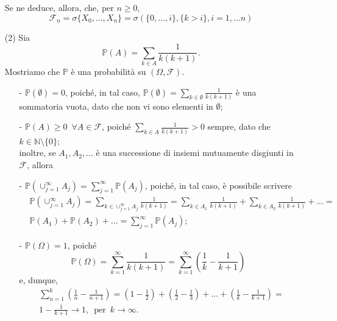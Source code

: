\documentclass[11pt,largemargins]{homework}
\begin{document}
\begin{enumerate}
  Se ne deduce, allora, che, per $n\geq 0$,
  \begin{equation*}
  \mathcal{F}_{n}=\sigma\{X_{0},...,X_{n}\}=\sigma(\{0, \dots , i\}, \{k > i\}, i = 1, \dots n)
  \end{equation*}
  \item[(2)]
  Sia
  \begin{equation*}
  \mathbb{P}\left(A\right)=\sum_{k\in A}\frac{1}{k\left(k+1\right)}.
  \end{equation*}
  Mostriamo che $\mathbb{P}$ è una probabilità su $\left(\Omega,\mathcal{F}\right)$.
  \begin{itemize}
  \item[-]
  $\mathbb{P}\left(\emptyset\right)=0$, poiché, in tal caso, $\mathbb{P}\left(\emptyset\right)=\sum_{k\in \emptyset}\frac{1}{k\left(k+1\right)}$ è una sommatoria vuota, dato che non vi sono elementi in $\emptyset$;
  \item[-]
  $\mathbb{P}\left(A\right)\geq 0 \,\,\,\forall A\in \mathcal{F}$, poiché $\sum_{k\in A}\frac{1}{k\left(k+1\right)}> 0$ sempre, dato che $k \in \mathbb{N}\setminus\{0\}$;\\
  inoltre, se $A_{1},A_{2},...$ è una successione di insiemi mutuamente disgiunti in $\mathcal{F}$, allora 
  \item[-]
  $\mathbb{P}\left(\cup_{j=1}^{\infty}A_{j}\right)=\sum_{j=1}^{\infty}\mathbb{P}\left(A_{j}\right)$, poiché, in tal caso, è possibile scrivere
  \begin{align*}
  &\mathbb{P}\left(\cup_{j=1}^{\infty}A_{j}\right)=\sum_{k\in\cup_{j=1}^{\infty}A_{j}}\frac{1}{k\left(k+1\right)}=\sum_{k\in A_{1}}\frac{1}{k\left(k+1\right)}+\sum_{k\in A_{2}}\frac{1}{k\left(k+1\right)}+...=\\
  &\mathbb{P}\left(A_{1}\right)+\mathbb{P}\left(A_{2}\right)+...=\sum_{j=1}^{\infty}\mathbb{P}\left(A_{j}\right);
\end{align*}   
\item[-]
$\mathbb{P}\left(\Omega\right)=1$, poiché
\begin{equation*}
\mathbb{P}\left(\Omega\right)=\sum_{k=1}^{\infty}\frac{1}{k\left(k+1\right)}=\sum_{k=1}^{\infty}\left(\frac{1}{k}-\frac{1}{k+1}\right)
\end{equation*}
e, dunque,
\begin{align*}
&\sum_{n=1}^{k}\left(\frac{1}{n}-\frac{1}{n+1}\right)=\left(1-\frac{1}{2}\right)+\left(\frac{1}{2}-\frac{1}{3}\right)+...+\left(\frac{1}{k}-\frac{1}{k+1}\right)=\\
&1-\frac{1}{k+1}\longrightarrow 1, \,\,\, \text{per}\,\,\, k\rightarrow \infty.

\end{align*}
\end{itemize}
\end{enumerate}
\end{document}
